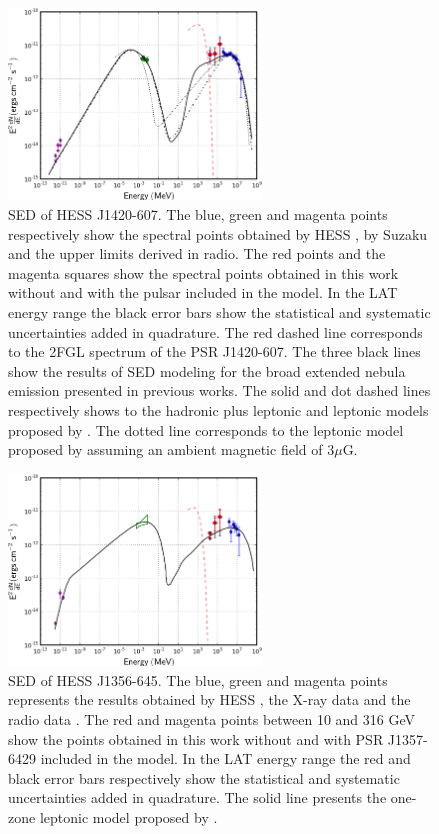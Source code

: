\begin{figure}[h!]
\centering
\includegraphics[width=0.60\textwidth]{figures/HESSJ1420.eps}
\caption{SED of HESS J1420-607. The blue, green and magenta points respectively show the spectral points obtained by HESS \citep{2006AA...456..245A}, by Suzaku \citep{2010ApJ...711.1168V} and the upper limits derived in radio. The red points and the magenta squares show the spectral points obtained in this work without and with the pulsar included in the model. In the LAT energy range the black error bars show the statistical and systematic uncertainties added in quadrature. The red dashed line corresponds to the 2FGL spectrum of the PSR J1420-607. The three black lines show the results of SED modeling for the broad extended nebula emission presented in previous works. The solid and dot dashed lines respectively shows to the hadronic plus leptonic and leptonic models proposed by \cite{2010ApJ...711.1168V}. The dotted line corresponds to the leptonic model proposed by \cite{2012ApJ...750..162K} assuming an ambient magnetic field of 3$\mu$G.
\label{fig:hessj1420}}
\end{figure}

\begin{figure}[h!]
\centering
\includegraphics[width=0.60\textwidth]{figures/HESSJ1356.eps}
\caption{SED of HESS J1356-645. The blue, green and magenta points represents the results obtained by HESS \citep{2011AA...533A.103H}, the X-ray data \citep{2011AA...533A.102L} and the radio data \citep{2007MNRAS.382..382M, 1995MNRAS.277...36D, 1993AJ....105.1666G}. The red and magenta points between 10 and 316 GeV show the points obtained in this work without and with PSR J1357-6429 included in the model. In the LAT energy range the red and black error bars respectively show the statistical and systematic uncertainties added in quadrature. The solid line presents the one-zone leptonic model proposed by \cite{2011AA...533A.103H}.
\label{fig:hess1356}}
\end{figure}

